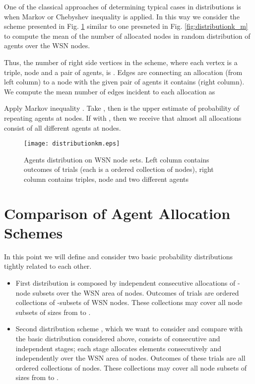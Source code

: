 \documentclass[conference]{IEEEtran}
\begin{document}
One of the classical approaches of determining typical cases in distributions is when Markov or Chebyshev inequality is applied. In this way we consider the scheme presented in Fig. \ref{fig:distributionkm} similar to one presneted in Fig. \ref{fig:distributionk_m} to compute the mean of the number of allocated nodes in random distribution of  agents over the  WSN nodes.


Thus, the number of right side vertices in the scheme, where each vertex is a triple, node and a pair of agents, is . Edges are connecting an allocation (from left column) to a node with the given pair of agents it contains (right column). We compute the mean number  of edges incident to each allocation as



Apply Markov inequality . Take , then  is the upper estimate of probability of repeating agents at nodes. If  with , then we receive that almost all allocations consist of all different agents at nodes.
\begin{figure}[tb]
\begin{center}
\begin{minipage}[h]{\linewidth}
\texttt{[image: distributionkm.eps]}
\end{minipage}
\end{center}
\caption{Agents distribution on WSN node sets. Left column contains outcomes of  trials (each  is a ordered collection of  nodes), right column contains triples, node and two different agents}
\label{fig:distributionkm}
\end{figure}
\section{Comparison of Agent Allocation Schemes}
In this point we will define and consider two basic probability distributions tightly related to each other.
\begin{itemize}
	\item First distribution  is composed by  independent consecutive allocations of -node subsets over the WSN area of  nodes.  Outcomes of trials are ordered collections of -subsets of WSN nodes. These collections may cover all node subsets of sizes from  to . 
	
	\item Second distribution scheme , which we want to consider and compare with the basic distribution  considered above, consists of  consecutive and independent stages; each stage allocates  elements consecutively and independently over the WSN area of  nodes. Outcomes of these trials are all  ordered collections of nodes. These collections may cover all node subsets of sizes from  to . 
\end{itemize}
\end{document}
